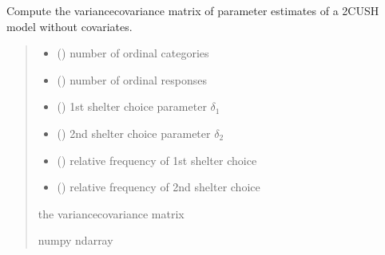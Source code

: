 \documentclass[letterpaper,10pt,english]{sphinxmanual}
\begin{document}

\begin{fulllineitems}
\label{\detokenize{cubmods:cubmods.cush2.varcov}}
\pysigstartsignatures
{}
\pysigstopsignatures
\sphinxAtStartPar
Compute the variance\sphinxhyphen{}covariance matrix of parameter 
estimates of a 2\sphinxhyphen{}CUSH model without covariates.
\begin{quote}\begin{description}
\begin{itemize}
\item {} 
\sphinxAtStartPar
{} () \textendash{} number of ordinal categories

\item {} 
\sphinxAtStartPar
{} () \textendash{} number of ordinal responses

\item {} 
\sphinxAtStartPar
{} () \textendash{} 1st shelter choice parameter \(\delta_1\)

\item {} 
\sphinxAtStartPar
{} () \textendash{} 2nd shelter choice parameter \(\delta_2\)

\item {} 
\sphinxAtStartPar
{} () \textendash{} relative frequency of 1st shelter choice

\item {} 
\sphinxAtStartPar
{} () \textendash{} relative frequency of 2nd shelter choice

\end{itemize}

\sphinxAtStartPar
the variance\sphinxhyphen{}covariance matrix

\sphinxAtStartPar
numpy ndarray

\end{description}\end{quote}

\end{fulllineitems}
\end{document}
